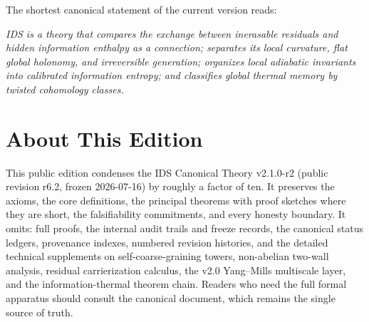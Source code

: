 \documentclass[11pt,a4paper]{article}
\newenvironment{canonbox}{\begin{mdframed}[style=canon]\itshape}{\end{mdframed}}
\theoremstyle{plain}
\begin{document}
The shortest canonical statement of the current version reads:

\begin{canonbox}
IDS is a theory that compares the exchange between inerasable residuals and hidden information enthalpy as a connection; separates its local curvature, flat global holonomy, and irreversible generation; organizes local adiabatic invariants into calibrated information entropy; and classifies global thermal memory by twisted cohomology classes.
\end{canonbox}

\appendix

\section{About This Edition}\label{app:about}

This public edition condenses the IDS Canonical Theory v2.1.0-r2 (public revision r6.2, frozen 2026-07-16) by roughly a factor of ten. It preserves the axioms, the core definitions, the principal theorems with proof sketches where they are short, the falsifiability commitments, and every honesty boundary. It omits: full proofs, the internal audit trails and freeze records, the canonical status ledgers, provenance indexes, numbered revision histories, and the detailed technical supplements on self-coarse-graining towers, non-abelian two-wall analysis, residual carrierization calculus, the v2.0 Yang--Mills multiscale layer, and the information-thermal theorem chain. Readers who need the full formal apparatus should consult the canonical document, which remains the single source of truth.
\end{document}
